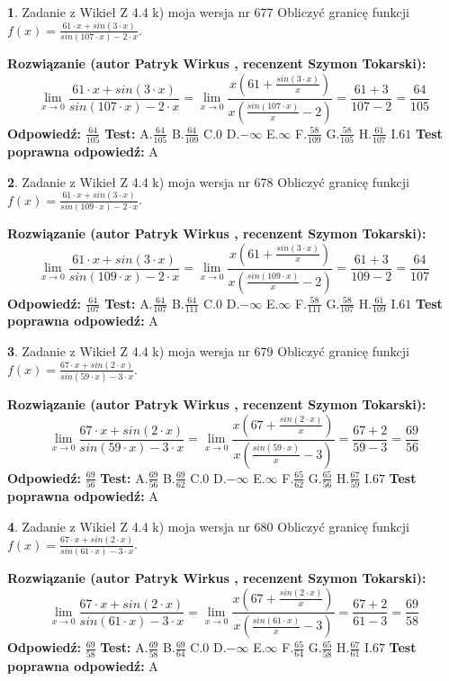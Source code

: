 \documentclass[12pt, a4paper]{article}
\theoremstyle{definition} %
\newtheorem{zad}{}
\newcommand{\zadStart}[1]{\begin{zad}#1\newline}
\newcommand{\zadStop}{\end{zad}}
\newcommand{\rozwStart}[2]{\noindent \textbf{Rozwiązanie (autor #1 , recenzent #2): }\newline}
\newcommand{\rozwStop}{\newline}
\newcommand{\odpStart}{\noindent \textbf{Odpowiedź:}\newline}
\newcommand{\odpStop}{\newline}
\newcommand{\testStart}{\noindent \textbf{Test:}\newline}
\newcommand{\testStop}{\newline}
\newcommand{\kluczStart}{\noindent \textbf{Test poprawna odpowiedź:}\newline}
\newcommand{\kluczStop}{\newline}
\begin{document}
\zadStart{Zadanie z Wikieł Z 4.4 k) moja wersja nr 677}
Obliczyć granicę funkcji $f(x)=\frac{61\cdot x +sin(3\cdot x)}{sin(107\cdot x) -2\cdot x}$.
\zadStop
\rozwStart{Patryk Wirkus}{Szymon Tokarski}
$$\lim\limits_{x\to 0}\frac{61\cdot x +sin(3\cdot x)}{sin(107\cdot x) -2\cdot x}
=\lim\limits_{x\to 0}\frac{x(61+\frac{sin(3\cdot x)}{x})}{x(\frac{sin(107\cdot x)}{x}-2)}
=\frac{61+3}{107-2} = \frac{64}{105}$$
\rozwStop
\odpStart
$\frac{64}{105}$
\odpStop
\testStart
A.$\frac{64}{105}$
B.$\frac{64}{109}$
C.$0$
D.$-\infty$
E.$\infty$
F.$\frac{58}{109}$
G.$\frac{58}{105}$
H.$\frac{61}{107}$
I.$61$
\testStop
\kluczStart
A
\kluczStop



\zadStart{Zadanie z Wikieł Z 4.4 k) moja wersja nr 678}
Obliczyć granicę funkcji $f(x)=\frac{61\cdot x +sin(3\cdot x)}{sin(109\cdot x) -2\cdot x}$.
\zadStop
\rozwStart{Patryk Wirkus}{Szymon Tokarski}
$$\lim\limits_{x\to 0}\frac{61\cdot x +sin(3\cdot x)}{sin(109\cdot x) -2\cdot x}
=\lim\limits_{x\to 0}\frac{x(61+\frac{sin(3\cdot x)}{x})}{x(\frac{sin(109\cdot x)}{x}-2)}
=\frac{61+3}{109-2} = \frac{64}{107}$$
\rozwStop
\odpStart
$\frac{64}{107}$
\odpStop
\testStart
A.$\frac{64}{107}$
B.$\frac{64}{111}$
C.$0$
D.$-\infty$
E.$\infty$
F.$\frac{58}{111}$
G.$\frac{58}{107}$
H.$\frac{61}{109}$
I.$61$
\testStop
\kluczStart
A
\kluczStop



\zadStart{Zadanie z Wikieł Z 4.4 k) moja wersja nr 679}
Obliczyć granicę funkcji $f(x)=\frac{67\cdot x +sin(2\cdot x)}{sin(59\cdot x) -3\cdot x}$.
\zadStop
\rozwStart{Patryk Wirkus}{Szymon Tokarski}
$$\lim\limits_{x\to 0}\frac{67\cdot x +sin(2\cdot x)}{sin(59\cdot x) -3\cdot x}
=\lim\limits_{x\to 0}\frac{x(67+\frac{sin(2\cdot x)}{x})}{x(\frac{sin(59\cdot x)}{x}-3)}
=\frac{67+2}{59-3} = \frac{69}{56}$$
\rozwStop
\odpStart
$\frac{69}{56}$
\odpStop
\testStart
A.$\frac{69}{56}$
B.$\frac{69}{62}$
C.$0$
D.$-\infty$
E.$\infty$
F.$\frac{65}{62}$
G.$\frac{65}{56}$
H.$\frac{67}{59}$
I.$67$
\testStop
\kluczStart
A
\kluczStop



\zadStart{Zadanie z Wikieł Z 4.4 k) moja wersja nr 680}
Obliczyć granicę funkcji $f(x)=\frac{67\cdot x +sin(2\cdot x)}{sin(61\cdot x) -3\cdot x}$.
\zadStop
\rozwStart{Patryk Wirkus}{Szymon Tokarski}
$$\lim\limits_{x\to 0}\frac{67\cdot x +sin(2\cdot x)}{sin(61\cdot x) -3\cdot x}
=\lim\limits_{x\to 0}\frac{x(67+\frac{sin(2\cdot x)}{x})}{x(\frac{sin(61\cdot x)}{x}-3)}
=\frac{67+2}{61-3} = \frac{69}{58}$$
\rozwStop
\odpStart
$\frac{69}{58}$
\odpStop
\testStart
A.$\frac{69}{58}$
B.$\frac{69}{64}$
C.$0$
D.$-\infty$
E.$\infty$
F.$\frac{65}{64}$
G.$\frac{65}{58}$
H.$\frac{67}{61}$
I.$67$
\testStop
\kluczStart
A
\kluczStop
\end{document}

